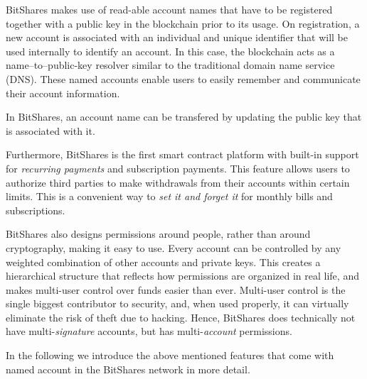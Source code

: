 BitShares makes use of read-able account names that have to be registered
together with a public key in the blockchain prior to its usage. On
registration, a new account is associated with an individual and unique
identifier that will be used internally to identify an account. In this case,
the blockchain acts as a name--to--public-key resolver similar to the
traditional domain name service (DNS). These named accounts enable users to
easily remember and communicate their account information. 

In BitShares, an account name can be transfered by updating the public key that
is associated with it.

Furthermore, BitShares is the first smart contract platform with built-in
support for \emph{recurring payments} and subscription payments. This feature
allows users to authorize third parties to make withdrawals from their accounts
within certain limits. This is a convenient way to \emph{set it and forget it}
for monthly bills and subscriptions.

BitShares also designs permissions around people, rather than around
cryptography, making it easy to use. Every account can be controlled by any
weighted combination of other accounts and private keys. This creates a
hierarchical structure that reflects how permissions are organized in real
life, and makes multi-user control over funds easier than ever. Multi-user
control is the single biggest contributor to security, and, when used properly,
it can virtually eliminate the risk of theft due to hacking. Hence, BitShares
does technically not have multi-\emph{signature} accounts, but has
multi-\emph{account} permissions.

\medskip

In the following we introduce the above mentioned features that come with named
account in the BitShares network in more detail.
